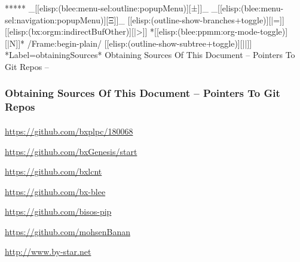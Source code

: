 \begin{whenOrg}
\begin{frame}[fragile,plain,label=obtainingSourcesInsert]
\begin{latexonly}
\end{latexonly}



\end{frame}


\begin{whenOrg}
*****  _[[elisp:(blee:menu-sel:outline:popupMenu)][±]]_ _[[elisp:(blee:menu-sel:navigation:popupMenu)][Ξ]]_ [[elisp:(outline-show-branches+toggle)][|=]] [[elisp:(bx:orgm:indirectBufOther)][|>]] *[[elisp:(blee:ppmm:org-mode-toggle)][|N]]*  /Frame:begin-plain/ [[elisp:(outline-show-subtree+toggle)][||]] *Label=obtainingSources* Obtaining Sources Of This Document -- Pointers To Git Repos --
\end{whenOrg}

\begin{frame}[fragile,plain,label=obtainingSources]
    \frametitle{Obtaining Sources Of This Document -- Pointers To Git Repos}
    \framesubtitle{}

    \url{https://github.com/bxplpc/180068}

    \bigskip

    \url{https://github.com/bxGenesis/start}

    \url{https://github.com/bxlcnt}

    \url{https://github.com/bx-blee}

    \url{https://github.com/bisos-pip}

    \bigskip

    \url{https://github.com/mohsenBanan}

    \url{http://www.by-star.net}



\end{frame}



\end{whenOrg}
